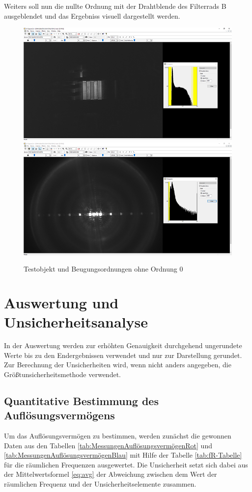 \documentclass[12pt,a4paper,twoside]{article}
\begin{document}
\noindent
Weiters soll nun die nullte Ordnung mit der Drahtblende des Filterrads B ausgeblendet und das Ergebniss visuell dargestellt werden.

\begin{figure}[H]
    \centering
    \includegraphics[width=0.45\linewidth]{nudes/AbbeTheorie/Aufgabe 3/4-2 ohne 0te ohne.PNG}
    \includegraphics[width=0.45\linewidth]{nudes/AbbeTheorie/Aufgabe 3/4-2 ohne 0te mit.PNG}
    \caption{Testobjekt und Beugungsordnungen ohne Ordnung 0}
    \label{fig:Aufabe3-ohneNullte}
\end{figure}



\section{Auswertung und Unsicherheitsanalyse} %

In der Auswertung werden zur erhöhten Genauigkeit durchgehend ungerundete Werte bis zu den Endergebnissen verwendet und nur zur Darstellung gerundet. \\
Zur Berechnung der Unsicherheiten wird, wenn nicht anders angegeben, die Größtunsicherheitsmethode verwendet.


\subsection{Quantitative Bestimmung des Auflösungsvermögens}

Um das Auflösungsvermögen zu bestimmen, werden zunächst die gewonnen Daten aus den Tabellen \ref{tab:MessungenAuflösungsvermögenRot} und \ref{tab:MessungenAuflösungsvermögenBlau} mit Hilfe der Tabelle \ref{tab:fR-Tabelle} für die räumlichen Frequenzen ausgewertet.
Die Unsicherheit setzt sich dabei aus der Mittelwertsformel \ref{eq:avg} der Abweichung zwischen dem Wert der räumlichen Frequenz und der Unsicherheitselemente zusammen.
\end{document}
